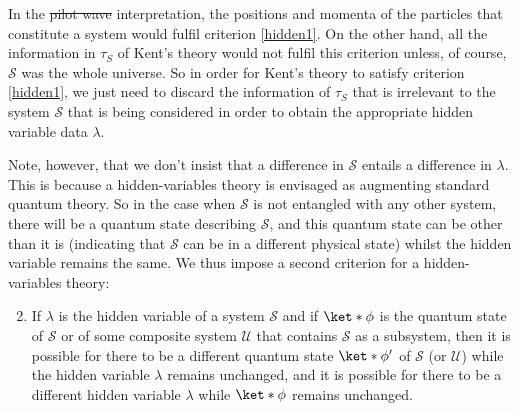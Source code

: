 \documentclass[12pt]{report}
\providecommand{\DIFadd}[1]{{\protect\color{blue}\uwave{#1}}} %
\providecommand{\DIFdel}[1]{{\protect\color{red}\sout{#1}}}                      %
\providecommand{\DIFaddbegin}{} %
\providecommand{\DIFaddend}{} %
\providecommand{\DIFdelbegin}{} %
\providecommand{\DIFdelend}{} %
\begin{document}
In the \DIFdelbegin \DIFdel{pilot wave }\DIFdelend \DIFaddbegin \DIFadd{Bohmian }\DIFaddend interpretation, the positions and momenta of the particles that constitute a system would fulfil criterion \ref{hidden1}. On the other hand, all the information in $\tau_S$ of Kent's theory would not fulfil this criterion unless, of course, $\mathcal{S}$ was the whole universe. So in order for Kent's theory to satisfy criterion \ref{hidden1}, we just need to discard the information of $\tau_S$ that is irrelevant to the system $\mathcal{S}$ that is being considered in order to obtain the appropriate hidden variable data $\lambda$. 

Note, however, that we don't insist that a difference in $\mathcal{S}$ entails a difference in $\lambda$. This is because a hidden-variables theory is envisaged as augmenting standard quantum theory. So in the case when $\mathcal{S}$ is not entangled with any other system, there will be a quantum state describing $\mathcal{S}$, and this quantum state can be other than it is (indicating that $\mathcal{S}$ can be in a different physical state)  whilst the hidden variable remains the same. We thus impose a second criterion for a hidden-variables theory:
\begin{enumerate}
	\setcounter{enumi}{1}
	\item \label{hidden3} If $\lambda$ is the hidden variable of a system $\mathcal{S}$ and if $\ket*{\phi}$ is the quantum state of $\mathcal{S}$ or of some composite system $\mathcal{U}$ that contains $\mathcal{S}$ as a subsystem, then it is possible for there to be a different quantum state $\ket*{\phi'}$ of $\mathcal{S}$ (or $\mathcal{U}$) while the hidden variable $\lambda$ remains unchanged, and it is possible for there to be a different hidden variable $\lambda$ while $\ket*{\phi}$ remains unchanged.
\end{enumerate} 
\end{document}
